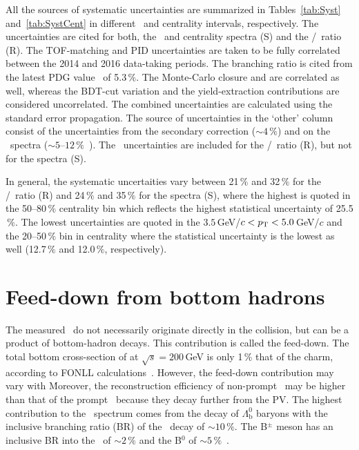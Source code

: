 All the sources of systematic uncertainties are summarized in Tables~\ref{tab:Syst} and~\ref{tab:SystCent} in different \pt\ and centrality intervals, respectively. The uncertainties are cited for both, the \pt\ and centrality spectra (S) and the \Lambdac/\dzero\ ratio (R)\@. The TOF-matching and PID uncertainties are taken to be fully correlated between the 2014 and 2016 data-taking periods. The branching ratio is cited from the latest PDG value~\cite{PDG} of 5.3$\,\%$\@. The Monte-Carlo closure and are correlated as well, whereas the BDT-cut variation and the yield-extraction contributions are considered uncorrelated. The combined uncertainties are calculated using the standard error propagation. The source of uncertainties in the `other' column consist of the uncertainties from the secondary correction ($\sim4\,\%$) and on the \dzero\ spectra ($\sim5$--$12\,\%$~\cite{D0paper})\@. The \dzero\ uncertainties are included for the \Lambdac/\dzero\ ratio (R), but not for the spectra (S)\@.

In general, the systematic uncertaities vary between 21$\,\%$ and 32$\,\%$ for the \Lambdac/\dzero\ ratio (R) and 24$\,\%$ and 35$\,\%$ for the spectra (S), where the highest is quoted in the 50--80$\,\%$ centrality bin which reflects the highest statistical uncertainty of 25.5$\,\%$\@. The lowest uncertainties are quoted in the $3.5\,$GeV/$c < {p_{\mathrm{T}}} < 5.0\,$GeV/$c$ and the 20--50$\,\%$ bin in centrality where the statistical uncertainty is the lowest as well (12.7$\,\%$ and 12.0$\,\%$, respectively).






\section{Feed-down from bottom hadrons}
The measured \Lambdac\ do not necessarily originate directly in the collision, but can be a product of bottom-hadron decays. This contribution is called the feed-down. The total bottom cross-section of at $\sqrt{s} = 200\,$GeV is only 1$\,\%$ that of the charm, according to FONLL calculations~\cite{FONLLcharm}\@. However, the feed-down contribution may vary with \pt\. Moreover, the reconstruction efficiency of non-prompt \Lambdac\ may be higher than that of the prompt \Lambdac\ because they decay further from the PV\@. The highest contribution to the \Lambdacpm\ spectrum comes from the decay of $\Lambda_\mathrm{b}^0$ baryons with the inclusive branching ratio (BR) of the \Lambdacpm\ decay of $\sim10\,\%$\@. The B$^\pm$ meson has an inclusive BR into the \Lambdacpm\ of $\sim 2\,\%$ and the B$^0$ of $\sim5\,\%$~\cite{PDG}\@.

